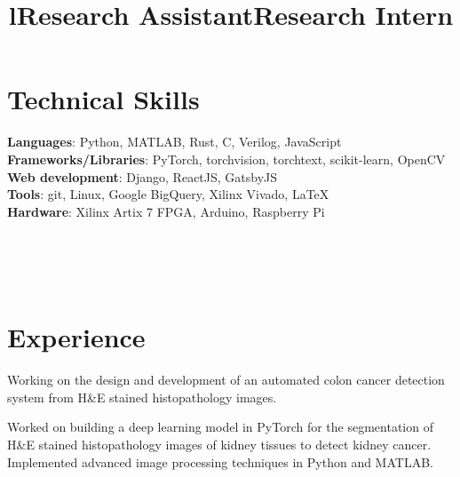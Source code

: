\documentclass[margin]{res}
\begin{document}
\begin{resume}
    \section{Technical Skills}
      \textbf{Languages}: Python, MATLAB, Rust, C, Verilog, JavaScript
      \\
      \textbf{Frameworks/Libraries}: PyTorch, torchvision, torchtext, scikit-learn, OpenCV
      \\
      \textbf{Web development}: Django, ReactJS, GatsbyJS
      \\
      \textbf{Tools}: git, Linux, Google BigQuery, Xilinx Vivado, \LaTeX
      \\
      \textbf{Hardware}: Xilinx Artix 7 FPGA, Arduino, Raspberry Pi


    \begin{format}
      \title{l}\\
      \\
      \body\\
    \end{format}

    \section{Experience}
      \title{\textbf{Research Assistant}}
      \begin{position}
        Working on the design and development of an automated colon cancer detection system from H\&E stained histopathology images.
      \end{position}

      \title{\textbf{Research Intern}}
      \begin{position}
        Worked on building a deep learning model in PyTorch for the  segmentation of H\&E stained histopathology images of kidney tissues to detect kidney cancer. Implemented advanced image processing techniques in Python and MATLAB.
      \end{position}


\end{resume}
\end{document}
